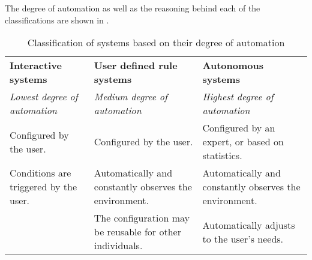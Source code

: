 The degree of automation as well as the reasoning behind each of the classifications are shown in .

\begin{table}[h]
    \centering
    \begin{tabularx}{\textwidth}{XXX}
    \textbf{Interactive systems}          & \textbf{User defined rule systems}                       & \textbf{Autonomous systems} \\
    \textit{Lowest degree of automation}  & \textit{Medium degree of automation}                     & \textit{Highest degree of automation}\\
    Configured by the user.               & Configured by the user.                                  & Configured by an expert, or based on statistics.\\
    Conditions are triggered by the user. & Automatically and constantly observes the environment.   & Automatically and constantly observes the environment.\\
    ~                                     & The configuration may be reusable for other individuals. & Automatically adjusts to the user's needs.\\
    \end{tabularx}
    \caption{Classification of systems based on their degree of automation}
    \label{tbl:system-categories}
\end{table}

